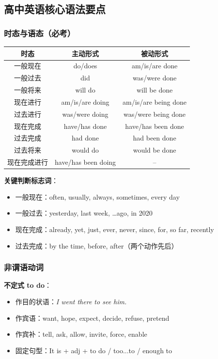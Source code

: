 \subsection{高中英语核心语法要点}

\subsubsection{时态与语态（必考）}

\begin{center}
\begin{tabular}{c|c|c}
\textbf{时态} & \textbf{主动形式} & \textbf{被动形式} \\ \toprule
一般现在 & do/does & am/is/are done \\
一般过去 & did & was/were done \\
一般将来 & will do & will be done \\
现在进行 & am/is/are doing & am/is/are being done \\
过去进行 & was/were doing & was/were being done \\
现在完成 & have/has done & have/has been done \\
过去完成 & had done & had been done \\
过去将来 & would do & would be done \\
现在完成进行 & have/has been doing & -- \\
\bottomrule
\end{tabular}
\end{center}

\textbf{关键判断标志词}：
\begin{itemize}
  \item 一般现在：often, usually, always, sometimes, every day
  \item 一般过去：yesterday, last week, \dots ago, in 2020
  \item 现在完成：already, yet, just, ever, never, since, for, so far, recently
  \item 过去完成：by the time, before, after（两个动作先后）
\end{itemize}

\subsubsection{非谓语动词}

\textbf{不定式 to do}：
\begin{itemize}
  \item 作目的状语：\textit{I went there to see him.}
  \item 作宾语：want, hope, expect, decide, refuse, pretend
  \item 作宾补：tell, ask, allow, invite, force, enable
  \item 固定句型：It is + adj + to do / too...to / enough to
\end{itemize}

